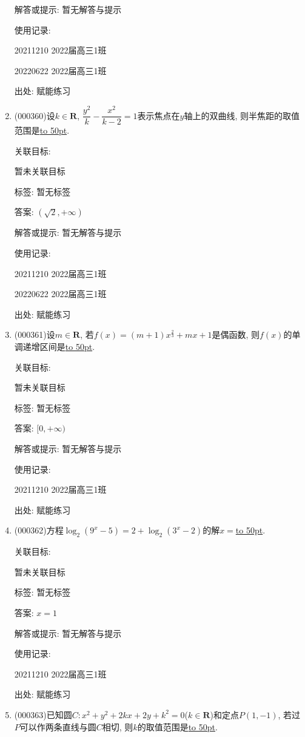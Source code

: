 \documentclass[10pt,a4paper]{article}
\newcommand{\blank}[1]{\underline{\hbox to #1pt{}}}
\begin{document}
\begin{enumerate}[1.]
解答或提示: 暂无解答与提示

使用记录:

20211210	2022届高三1班	

20220622	2022届高三1班  	


出处: 赋能练习
\item { (000360)}设$k\in \mathbf{R}$, $\dfrac{y^2}{k}-\dfrac{x^2}{k-2}=1$表示焦点在$y$轴上的双曲线, 则半焦距的取值范围是\blank{50}.


关联目标:

暂未关联目标



标签: 暂无标签

答案: $(\sqrt 2,+\infty)$

解答或提示: 暂无解答与提示

使用记录:

20211210	2022届高三1班	

20220622	2022届高三1班  	


出处: 赋能练习
\item { (000361)}设$m\in \mathbf{R}$, 若$f(x)=(m+1)x^{\tfrac{2}{3}}+mx+1$是偶函数, 则$f(x)$的单调递增区间是\blank{50}.


关联目标:

暂未关联目标



标签: 暂无标签

答案: $[0,+\infty)$

解答或提示: 暂无解答与提示

使用记录:

20211210	2022届高三1班	


出处: 赋能练习
\item { (000362)}方程$\log_2(9^x-5)=2+\log_2(3^x-2)$的解$x=$\blank{50}.


关联目标:

暂未关联目标



标签: 暂无标签

答案: $x=1$

解答或提示: 暂无解答与提示

使用记录:

20211210	2022届高三1班	


出处: 赋能练习
\item { (000363)}已知圆$C:x^2+y^2+2kx+2y+k^2=0$($k\in \mathbf{R}$)和定点$P(1,-1)$, 若过$P$可以作两条直线与圆$C$相切, 则$k$的取值范围是\blank{50}.



\end{enumerate}
\end{document}
